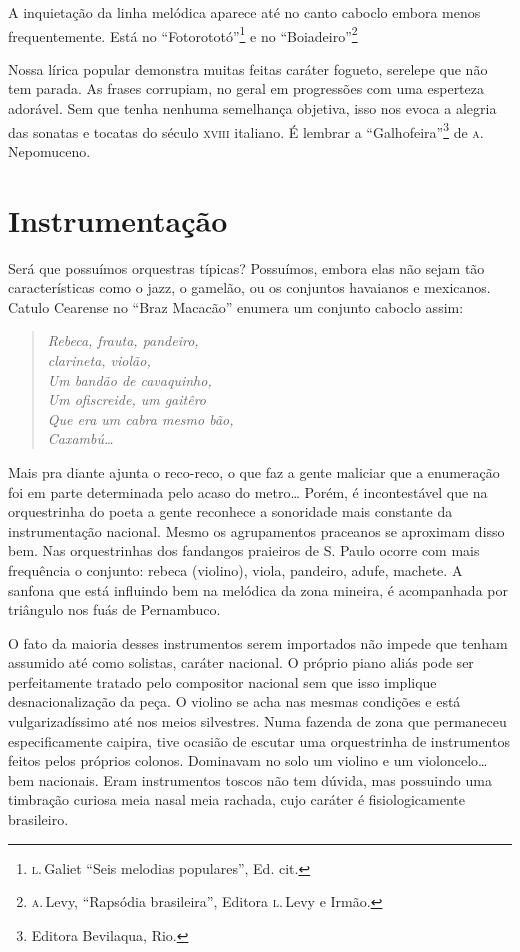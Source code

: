 A inquietação da linha melódica aparece até no canto caboclo embora
menos frequentemente. Está no ``Fotorototó''\footnote{\textsc{l}.\,Galiet ``Seis melodias
populares'', Ed. cit.} e no ``Boiadeiro''\footnote{\textsc{a}.\,Levy, ``Rapsódia brasileira'',
Editora \textsc{l}.\,Levy e Irmão.}

Nossa lírica popular demonstra muitas feitas caráter fogueto, serelepe
que não tem parada. As frases corrupiam, no geral em progressões com uma
esperteza adorável. Sem que tenha nenhuma semelhança objetiva, isso nos
evoca a alegria das sonatas e tocatas do século \textsc{xviii} italiano. É lembrar
a ``Galhofeira''\footnote{Editora Bevilaqua, Rio.} de \textsc{a}.\,Nepomuceno.

\section{Instrumentação}

Será que possuímos orquestras típicas? Possuímos, embora elas não sejam
tão características como o jazz, o gamelão, ou os conjuntos havaianos e
mexicanos. Catulo Cearense no ``Braz Macacão'' enumera um conjunto caboclo
assim:

\begin{verse}
\emph{Rebeca, frauta, pandeiro,}\\
\emph{clarineta, violão,}\\
\emph{Um bandão de cavaquinho,}\\
\emph{Um ofiscreide, um gaitêro}\\
\emph{Que era um cabra mesmo bão,}\\
\emph{Caxambú\ldots{}}
\end{verse}

Mais pra diante ajunta o reco-reco, o que faz a gente maliciar que a
enumeração foi em parte determinada pelo acaso do metro\ldots{} Porém, é
incontestável que na orquestrinha do poeta a gente reconhece a
sonoridade mais constante da instrumentação nacional. Mesmo os
agrupamentos praceanos se aproximam disso bem. Nas orquestrinhas dos
fandangos praieiros de S. Paulo ocorre com mais frequência o conjunto:
rebeca (violino), viola, pandeiro, adufe, machete. A sanfona que está
influindo bem na melódica da zona mineira, é acompanhada por triângulo
nos fuás de Pernambuco.

O fato da maioria desses instrumentos serem importados não impede que
tenham assumido até como solistas, caráter nacional. O próprio piano
aliás pode ser perfeitamente tratado pelo compositor nacional sem que
isso implique desnacionalização da peça. O violino se acha nas mesmas
condições e está vulgarizadíssimo até nos meios silvestres. Numa fazenda
de zona que permaneceu especificamente caipira, tive ocasião de escutar
uma orquestrinha de instrumentos feitos pelos próprios colonos.
Dominavam no solo um violino e um violoncelo\ldots{} bem nacionais. Eram
instrumentos toscos não tem dúvida, mas possuindo uma timbração curiosa
meia nasal meia rachada, cujo caráter é fisiologicamente brasileiro.


